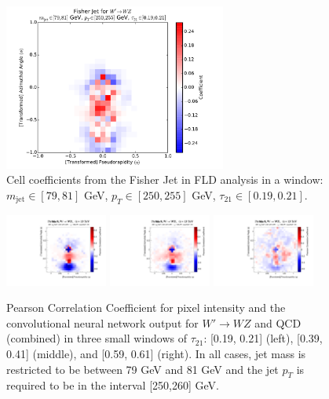 \begin{figure}[h!]
  \centering
  \includegraphics[width=0.65\textwidth]{figures/fld-benwindow.pdf}
  \caption{Cell coefficients from the Fisher Jet in FLD analysis in a window: $m_\text{jet}\in [79, 81]$ GeV, $p_{T}\in [250, 255]$ GeV, $\tau_{21}\in[0.19, 0.21]$.}
  \label{fig:fldWindow}
\end{figure}

\begin{figure}[h!]
  \centering
  \includegraphics[width=0.3\textwidth]{figures/corr_map_20.pdf}  \includegraphics[width=0.3\textwidth]{figures/corr_map_40.pdf}  \includegraphics[width=0.3\textwidth]{figures/corr_map_60.pdf}
  \caption{Pearson Correlation Coefficient for pixel intensity and the convolutional neural network output for $W'\rightarrow WZ$ and QCD (combined) in three small windows of $\tau_{21}$: [0.19, 0.21] (left), [0.39, 0.41] (middle), and [0.59, 0.61] (right).  In all cases, jet mass is restricted to be between 79 GeV and 81 GeV and the jet $p_T$ is required to be in the interval [250,260] GeV.}
  \label{fig:corrWindow}
\end{figure}


